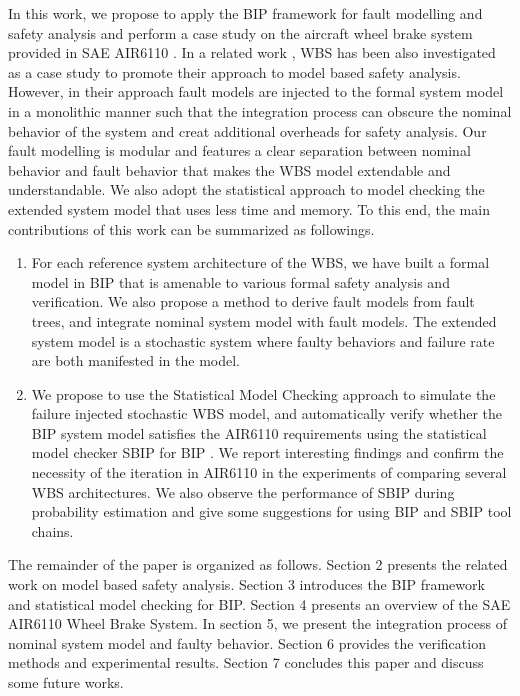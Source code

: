 In this work, we propose to apply the BIP framework for fault modelling and safety analysis 
 and perform a case study on the aircraft wheel brake system provided in SAE AIR6110 \cite{air6110}.
 In a related work \cite{cav15}, WBS has been also investigated as a case study to promote their approach to model based safety analysis.
 However, in their approach fault models are injected to the formal system model in a monolithic manner 
 such that the integration process can obscure the nominal behavior of the system and creat additional overheads for safety analysis.
 Our fault modelling is modular and features a clear separation between nominal behavior and fault behavior that makes the WBS model extendable and understandable.
 We also adopt the statistical approach to model checking the extended system model that uses less time and memory.
%
 To this end, the main contributions of this work can be summarized as followings.
%
\begin{enumerate}
\item For each reference system architecture of the WBS, we have built a formal model in BIP that is amenable to various formal safety analysis and verification.
 We also propose a method to derive fault models from fault trees, and integrate nominal system model with fault models. 
 The extended system model is a stochastic system where faulty behaviors and failure rate are both manifested in the model.

\item We propose to use the Statistical Model Checking\cite{vmcai04,cav04,cmu04} approach to simulate the failure injected stochastic WBS model,
 and automatically verify whether the BIP system model satisfies the AIR6110 requirements using the statistical model checker SBIP for BIP \cite{sbip18}.
 We report interesting findings and confirm the necessity of the iteration in AIR6110 in the experiments of comparing several WBS architectures. 
 We also observe the performance of SBIP during probability estimation and give some suggestions for using BIP and SBIP tool chains.
\end{enumerate}

The remainder of the paper is organized as follows. 
Section 2 presents the related work on model based safety analysis.
Section 3 introduces the BIP framework and statistical model checking for BIP.
Section 4 presents an overview of the SAE AIR6110 Wheel Brake System.
In section 5, we present the integration process of nominal system model and faulty behavior.
Section 6 provides the verification methods and experimental results.
Section 7 concludes this paper and discuss some future works.
